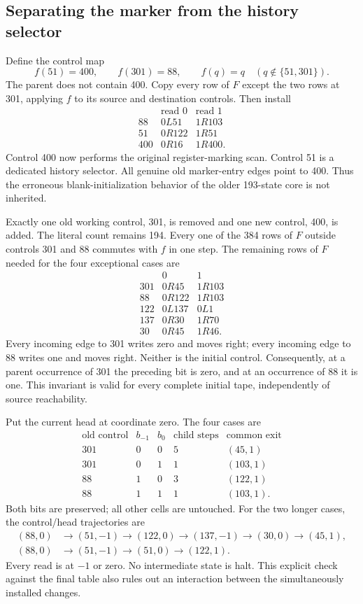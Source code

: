 \subsection{Separating the marker from the history selector}
Define the control map
\[
 f(51)=400,\qquad f(301)=88,\qquad
 f(q)=q\quad(q\notin\{51,301\}).
\]
The parent does not contain 400. Copy every row of $F$ except the two rows
at 301, applying $f$ to its source and destination controls. Then install
\[
\begin{array}{c|cc}
 &\text{read 0}&\text{read 1}\\\hline
88&0L51&1R103\\
51&0R122&1R51\\
400&0R16&1R400.
\end{array}\tag{2}
\]
Control 400 now performs the original register-marking scan. Control 51
is a dedicated history selector. All genuine old marker-entry edges point
to 400. Thus the erroneous blank-initialization behavior of the older
193-state core is not inherited.

Exactly one old working control, 301, is removed and one new control,
400, is added. The literal count remains 194. Every one of the 384 rows
of $F$ outside controls 301 and 88 commutes with $f$ in one step.
The remaining rows of $F$ needed for the four exceptional cases are
\[
\begin{array}{c|cc}
 &0&1\\\hline
301&0R45&1R103\\
88&0R122&1R103\\
122&0L137&0L1\\
137&0R30&1R70\\
30&0R45&1R46.
\end{array}
\]
Every incoming edge to 301 writes zero and moves right; every incoming edge
to 88 writes one and moves right. Neither is the initial control.
Consequently, at a parent occurrence of 301 the preceding bit is zero,
and at an occurrence of 88 it is one. This invariant is valid for every
complete initial tape, independently of source reachability.

Put the current head at coordinate zero. The four cases are
\[
\begin{array}{cccrl}
\text{old control}&b_{-1}&b_0&\text{child steps}&\text{common exit}\\\hline
301&0&0&5&(45,1)\\
301&0&1&1&(103,1)\\
88&1&0&3&(122,1)\\
88&1&1&1&(103,1).
\end{array}\tag{3}
\]
Both bits are preserved; all other cells are untouched. For the two longer
cases, the control/head trajectories are
\begin{align*}
(88,0)&\to(51,-1)\to(122,0)\to(137,-1)
             \to(30,0)\to(45,1),\\
(88,0)&\to(51,-1)\to(51,0)\to(122,1).
\end{align*}
Every read is at $-1$ or zero. No intermediate state is halt. This explicit
check against the final table also rules out an interaction between the
simultaneously installed changes.

